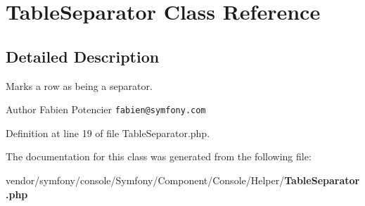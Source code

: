 \section{Table\+Separator Class Reference}
\label{class_symfony_1_1_component_1_1_console_1_1_helper_1_1_table_separator}


\subsection{Detailed Description}
Marks a row as being a separator.

\begin{DoxyAuthor}{Author}
Fabien Potencier {\tt fabien@symfony.\+com} 
\end{DoxyAuthor}


Definition at line 19 of file Table\+Separator.\+php.



The documentation for this class was generated from the following file\+:\begin{DoxyCompactItemize}
\item 
vendor/symfony/console/\+Symfony/\+Component/\+Console/\+Helper/{\bf Table\+Separator.\+php}\end{DoxyCompactItemize}
